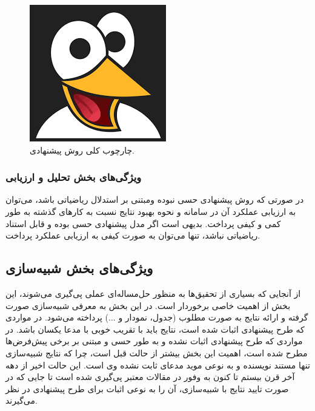 \documentclass{CSICC2020}
\begin{document}
\begin{figure}[t]
\includegraphics[width=.9\linewidth]{Images/blank}
\caption{چارچوب کلی روش پیشنهادی.}
\label{fig:OneLRoneHR}
\end{figure}


\subsubsection{ویژگی‌های بخش تحلیل و ارزیابی}
در صورتی که روش پیشنهادی حسی نبوده ومبتنی بر استدلال ریاضیاتی باشد، می‌توان به ارزیابی عملکرد آن در سامانه و نحوه بهبود نتایج نسبت به کارهای گذشته به طور کمی و کیفی پرداخت. بدیهی است اگر مدل پیشنهادی حسی بوده و قابل استناد ریاضیاتی نباشد، تنها می‌توان به صورت کیفی به ارزیابی عملکرد پرداخت.


\subsection{ویژگی‌های بخش شبیه‌سازی}
\label{Sec:ExperimentalResults}

از آنجایی که بسیاری از تحقیق‌ها به منظور حل‌مساله‌ای عملی پی‌گیری می‌شوند، این بخش از اهمیت خاصی برخوردار است. در این بخش به معرفی شبیه‌سازی صورت گرفته و ارائه نتایج به صورت مطلوب (جدول، نمودار و ...) پرداخته می‌شود. در مواردی که طرح پیشنهادی اثبات شده است، نتایج باید با تقریب خوبی با مدعا یکسان باشد. در مواردی که طرح پیشنهادی اثبات نشده و به طور حسی و مبتنی بر برخی پیش‌فرض‌ها مطرح شده است،  اهمیت این بخش بیشتر از حالت قبل است، چرا که نتایج شبیه‌سازی تنها مستند نویسنده و به نوعی موید مدعای ثابت نشده وی است. این حالت اخیر از دهه آخر قرن بیستم تا کنون به وفور در مقالات معتبر پی‌گیری شده است تا جایی که در صورت تایید نتایج با شبیه‌سازی، آن را به نوعی اثبات برای طرح پیشنهادی در نظر می‌گیرند.
\end{document}
